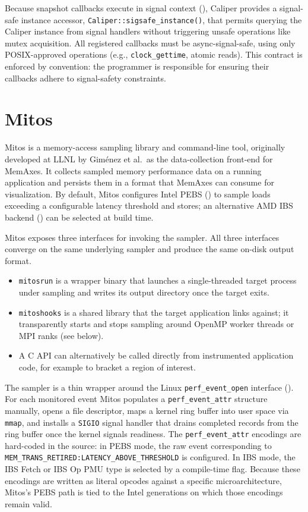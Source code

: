 Because snapshot callbacks execute in signal context (), Caliper provides a signal-safe instance accessor, \texttt{Caliper::sigsafe\_instance()}, that permits querying the Caliper instance from signal handlers without triggering unsafe operations like mutex acquisition. All registered callbacks must be async-signal-safe, using only POSIX-approved operations (e.g., \texttt{clock\_gettime}, atomic reads). This contract is enforced by convention: the programmer is responsible for ensuring their callbacks adhere to signal-safety constraints.

\section{Mitos}\label{sec:mitos}

Mitos is a memory-access sampling library and command-line tool, originally developed at LLNL by Giménez et al.\ as the data-collection front-end for MemAxes\cite{memaxes}. It collects sampled memory performance data on a running application and persists them in a format that MemAxes can consume for visualization. By default, Mitos configures Intel PEBS () to sample loads exceeding a configurable latency threshold and stores; an alternative AMD IBS backend () can be selected at build time\cite{mitosIBS,Vanecek2026}.\cite{mitosGh}

Mitos exposes three interfaces for invoking the sampler\cite{mitosGh}. All three interfaces converge on the same underlying sampler and produce the same on-disk output format.
\begin{itemize}
    \item \texttt{mitosrun} is a wrapper binary that launches a single-threaded target process under sampling and writes its output directory once the target exits. 
    \item \texttt{mitoshooks} is a shared library that the target application links against; it transparently starts and stops sampling around OpenMP worker threads or MPI ranks (see below).
    \item A C API can alternatively be called directly from instrumented application code, for example to bracket a region of interest. 
\end{itemize}

The sampler is a thin wrapper around the Linux \texttt{perf\_event\_open} interface (). For each monitored event Mitos populates a \texttt{perf\_event\_attr} structure manually, opens a file descriptor, maps a kernel ring buffer into user space via \texttt{mmap}, and installs a \texttt{SIGIO} signal handler that drains completed records from the ring buffer once the kernel signals readiness\cite{perfManpage}. The \texttt{perf\_event\_attr} encodings are hard-coded in the source: in PEBS mode, the raw event corresponding to \texttt{MEM\_TRANS\_RETIRED:LATENCY\_ABOVE\_THRESHOLD} is configured. In IBS mode, the IBS Fetch or IBS Op PMU type is selected by a compile-time flag\cite{mitosGh,Vanecek2026}. Because these encodings are written as literal opcodes against a specific microarchitecture, Mitos's PEBS path is tied to the Intel generations on which those encodings remain valid.

